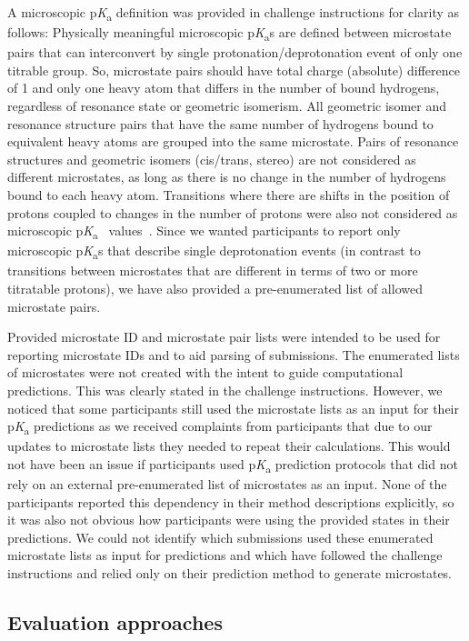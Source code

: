 \documentclass[9pt,lineno,final]{elife}
\newcommand{\pKa}{p\textit{K}\textsubscript{a}}
\begin{document}
A microscopic \pKa{} definition was provided in challenge instructions for clarity as follows:
Physically meaningful microscopic \pKa{}s are defined between microstate pairs that can interconvert by single protonation/deprotonation event of only one titrable group. 
So, microstate pairs should have total charge (absolute) difference of 1 and only one heavy atom that differs in the number of bound hydrogens, regardless of resonance state or geometric isomerism. 
All geometric isomer and resonance structure pairs that have the same number of hydrogens bound to equivalent heavy atoms are grouped into the same microstate. 
Pairs of resonance structures and geometric isomers (cis/trans, stereo) are not considered as different microstates, as long as there is no change in the number of hydrogens bound to each heavy atom.
Transitions where there are shifts in the position of protons coupled to changes in the number of protons were also not considered as microscopic \pKa{}~ values~\citep{Gunner:2020:J.Comput.AidedMol.Des.}.
Since we wanted participants to report only microscopic \pKa{}s that describe single deprotonation events (in contrast to transitions between microstates that are different in terms of two or more titratable protons), we have also provided a pre-enumerated list of allowed microstate pairs.


Provided microstate ID and microstate pair lists were intended to be used for reporting microstate IDs and to aid parsing of submissions. 
The enumerated lists of microstates were not created with the intent to guide computational predictions. 
This was clearly stated in the challenge instructions. 
However, we noticed that some participants still used the microstate lists as an input for their \pKa{} predictions as we received complaints from participants that due to our updates to microstate lists they needed to repeat their calculations. 
This would not have been an issue if participants used \pKa{} prediction protocols that did not rely on an external pre-enumerated list of microstates as an input.
None of the participants reported this dependency in their method descriptions explicitly, so it was also not obvious how participants were using the provided states in their predictions.
We could not identify which submissions used these enumerated microstate lists as input for predictions and which have followed the challenge instructions and relied only on their prediction method to generate microstates.

\subsection{Evaluation approaches}
\end{document}
